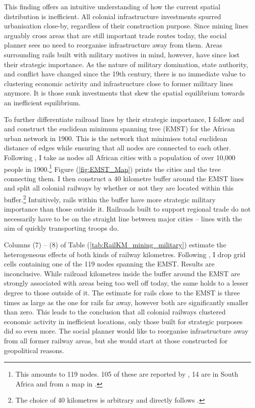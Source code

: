 \documentclass[11pt, oneside]{article}   	%
\let\oldref\ref
\renewcommand{\ref}[1]{(\oldref{#1})}
\begin{document}
This finding offers an intuitive understanding of how the current spatial distribution is inefficient. All colonial infrastructure investments spurred urbanisation close-by, regardless of their construction purpose. Since mining lines arguably cross areas that are still important trade routes today, the social planner sees no need to reorganise infrastructure away from them. Areas surrounding rails built with military motives in mind, however, have since lost their strategic importance. As the nature of military domination, state authority, and conflict have changed since the 19th century, there is no immediate value to clustering economic activity and infrastructure close to former military lines anymore. It is those sunk investments that skew the spatial equilibrium towards an inefficient equilibrium.

To further differentiate railroad lines by their strategic importance, I follow \cite{jedwab_permanent_2016} and \cite{faber_trade_2014} and construct the euclidean minimum spanning tree (EMST) for the African urban network in 1900. This is the network that minimises total euclidean distance of edges while ensuring that all nodes are connected to each other. Following \citeauthor{jedwab_permanent_2016}, I take as nodes all African cities with a population of over 10,000 people in 1900.\footnote{This amounts to 119 nodes. 105 of these are reported by \cite{jedwab_permanent_2016}, 14 are in South Africa and from a map in \cite{Herranz-Loncan_publicbenefitRailways_2017}.} Figure \ref{fig:EMST_Map} prints the cities and the tree connecting them. I then construct a 40 kilometre buffer around the EMST lines and split all colonial railways by whether or not they are located within this buffer.\footnote{The choice of 40 kilometres is arbitrary and directly follows \cite{jedwab_permanent_2016}.} Intuitively, rails within the buffer have more strategic military importance than those outside it. Railroads built to support regional trade do not necessarily have to be on the straight line between major cities -- lines with the aim of quickly transporting troops do.

Columns (7) -- (8) of Table \ref{tab:RailKM_mining_military} estimate the heterogeneous effects of both kinds of railway kilometres. Following \citeauthor{jedwab_permanent_2016}, I drop grid cells containing one of the 119 nodes spanning the EMST. Results are inconclusive. While railroad kilometres inside the buffer around the EMST are strongly associated with areas being too well off today, the same holds to a lesser degree to those outside of it. The estimate for rails close to the EMST is three times as large as the one for rails far away, however both are significantly smaller than zero. This leads to the conclusion that all colonial railways clustered economic activity in inefficient locations, only those built for strategic purposes did so even more. The social planner would like to reorganise infrastructure away from all former railway areas, but she would start at those constructed for geopolitical reasons.
\end{document}
